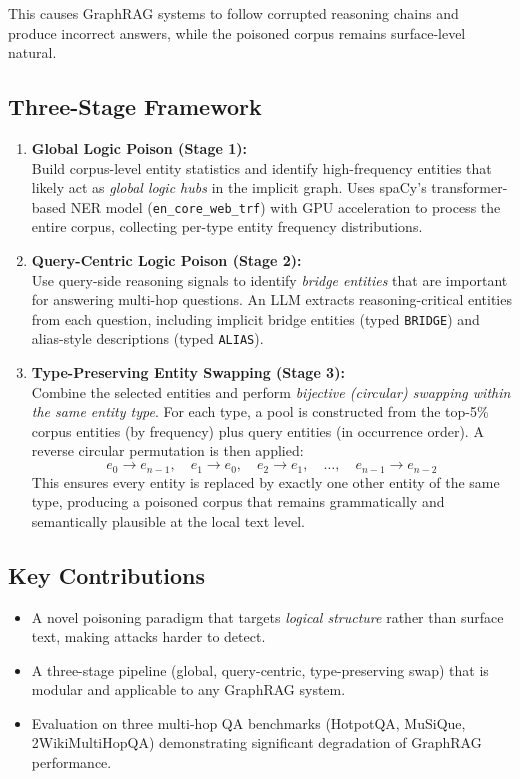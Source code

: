 \documentclass[11pt,a4paper]{article}
\begin{document}
This causes GraphRAG systems to follow corrupted reasoning chains and produce
incorrect answers, while the poisoned corpus remains surface-level natural.

\subsection{Three-Stage Framework}

\begin{enumerate}
  \item \textbf{Global Logic Poison (Stage 1):}\\
    Build corpus-level entity statistics and identify high-frequency entities
    that likely act as \emph{global logic hubs} in the implicit graph.
    Uses spaCy's transformer-based NER model (\texttt{en\_core\_web\_trf}) with
    GPU acceleration to process the entire corpus, collecting per-type entity
    frequency distributions.

  \item \textbf{Query-Centric Logic Poison (Stage 2):}\\
    Use query-side reasoning signals to identify \emph{bridge entities} that are
    important for answering multi-hop questions.  An LLM extracts reasoning-critical
    entities from each question, including implicit bridge entities (typed
    \texttt{BRIDGE}) and alias-style descriptions (typed \texttt{ALIAS}).

  \item \textbf{Type-Preserving Entity Swapping (Stage 3):}\\
    Combine the selected entities and perform \emph{bijective (circular) swapping
    within the same entity type}.  For each type, a pool is constructed from the
    top-5\% corpus entities (by frequency) plus query entities (in occurrence order).
    A reverse circular permutation is then applied:
    \[
      e_0 \to e_{n-1},\quad
      e_1 \to e_0,\quad
      e_2 \to e_1,\quad
      \ldots,\quad
      e_{n-1} \to e_{n-2}
    \]
    This ensures every entity is replaced by exactly one other entity of the same
    type, producing a poisoned corpus that remains grammatically and semantically
    plausible at the local text level.
\end{enumerate}

\subsection{Key Contributions}

\begin{itemize}[nosep]
  \item A novel poisoning paradigm that targets \emph{logical structure} rather than
        surface text, making attacks harder to detect.
  \item A three-stage pipeline (global, query-centric, type-preserving swap) that
        is modular and applicable to any GraphRAG system.
  \item Evaluation on three multi-hop QA benchmarks (HotpotQA, MuSiQue,
        2WikiMultiHopQA) demonstrating significant degradation of GraphRAG
        performance.
\end{itemize}
\end{document}
